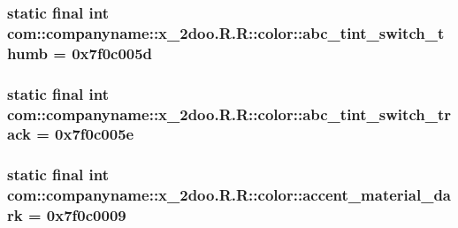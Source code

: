 \hypertarget{classcom_1_1companyname_1_1x__2doo_1_1_r_1_1color_8b4ef3e281464f0cc55097f227ada90c}{
\subsubsection[{abc\_\-tint\_\-switch\_\-thumb}]{\setlength{\rightskip}{0pt plus 5cm}static final int com::companyname::x\_\-2doo.R.R::color::abc\_\-tint\_\-switch\_\-thumb = 0x7f0c005d}}
\label{classcom_1_1companyname_1_1x__2doo_1_1_r_1_1color_8b4ef3e281464f0cc55097f227ada90c}


\hypertarget{classcom_1_1companyname_1_1x__2doo_1_1_r_1_1color_f23f3fef4718d1be272a96c706424d8e}{
\subsubsection[{abc\_\-tint\_\-switch\_\-track}]{\setlength{\rightskip}{0pt plus 5cm}static final int com::companyname::x\_\-2doo.R.R::color::abc\_\-tint\_\-switch\_\-track = 0x7f0c005e}}
\label{classcom_1_1companyname_1_1x__2doo_1_1_r_1_1color_f23f3fef4718d1be272a96c706424d8e}


\hypertarget{classcom_1_1companyname_1_1x__2doo_1_1_r_1_1color_a5ebe268c24a717271f8732646286265}{
\subsubsection[{accent\_\-material\_\-dark}]{\setlength{\rightskip}{0pt plus 5cm}static final int com::companyname::x\_\-2doo.R.R::color::accent\_\-material\_\-dark = 0x7f0c0009}}
\label{classcom_1_1companyname_1_1x__2doo_1_1_r_1_1color_a5ebe268c24a717271f8732646286265}


